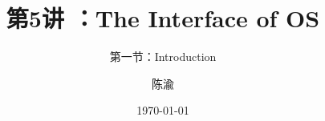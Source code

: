 


\title[第5讲]{第5讲 ：The Interface of OS} %
\subtitle{第一节：Introduction }
\author{陈渝} %
\date{\today} %




\begin{frame}
\titlepage %
\end{frame}

